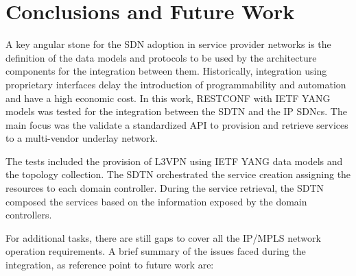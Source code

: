\documentclass[10pt, conference]{IEEEtran}
\begin{document}
\section{Conclusions and Future Work}
\label{section:conclusions}

A key angular stone for the SDN adoption in service provider networks is the definition of the data models and protocols to be used by the architecture components for the integration between them. Historically, integration using proprietary interfaces delay the introduction of programmability and automation and have a high economic cost. In this work, RESTCONF with IETF YANG models was tested for the integration between the SDTN and the IP SDNcs. The main focus was the validate a standardized API to provision and retrieve services to a multi-vendor underlay network.

The tests included the provision of L3VPN using IETF YANG data models and the topology collection. The SDTN orchestrated the service creation assigning the resources to each domain controller. During the service retrieval, the SDTN composed the services based on the information exposed by the domain controllers.

For additional tasks, there are still gaps to cover all the IP/MPLS network operation requirements. A brief summary of the issues faced during the integration, as reference point to future work are: 
\end{document}
